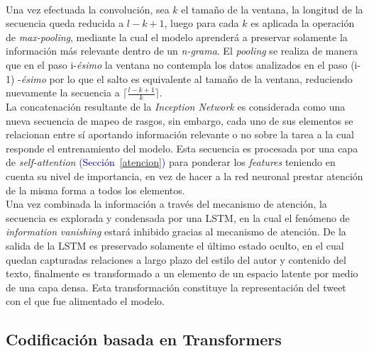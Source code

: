 	\\
	Una vez efectuada la convolución, sea $k$ el tamaño de la ventana, la longitud de la secuencia queda reducida a $l-k + 1$, luego para cada $k$ es aplicada la operación de \textit{max-pooling}, mediante la cual el modelo aprenderá a preservar solamente la información más relevante dentro de un \textit{n-grama}. El \textit{pooling} se realiza de manera que en el paso i-\textit{\'{e}simo} la ventana no contempla los datos analizados en el paso (i-1) -\textit{\'{e}simo} por lo que el salto es equivalente al tamaño de la ventana, reduciendo nuevamente la secuencia a $\lceil\frac{l - k + 1}{k}\rceil$.
	\\
	La concatenación resultante de la\textit{ Inception Network} es considerada como una nueva secuencia de mapeo de rasgos, sin embargo, cada uno de sus elementos se relacionan entre sí aportando información relevante o no sobre la tarea a la cual responde el entrenamiento del modelo. Esta secuencia es procesada por una capa de \textit{self-attention} \textcolor{darkblue}{(Sección~\ref{atencion})} para ponderar los \textit{features} teniendo en cuenta su nivel de importancia, en vez de hacer a la red neuronal prestar atención de la misma forma a todos los elementos.
	\\
	Una vez combinada la información a través del mecanismo de atención, la secuencia es explorada y condensada por una LSTM, en la cual el fenómeno de \textit{information vanishing} estará inhibido gracias al mecanismo de atención. De la salida de la LSTM es preservado solamente el último estado oculto, en el cual quedan capturadas relaciones a largo plazo del estilo del autor y contenido del texto, finalmente es transformado a un elemento de un espacio latente por medio de una capa densa. Esta transformación constituye la representación del tweet con el que fue alimentado el modelo. 
	
	\subsection{Codificación basada en Transformers}\label{ref_trans}
	

